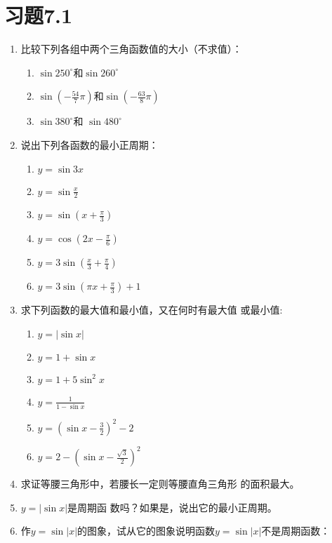 \section*{习题7.1}
\begin{enumerate}
    \item 比较下列各组中两个三角函数值的大小（不求值）：
    \begin{enumerate}
        \item $\sin250^{\circ}$和$\sin260^{\circ}$
        \item $\sin\left(-\frac{54}{7}\pi\right)$和$\sin\left(-\frac{63}{8}\pi\right)$
        \item $\sin380^{\circ}$和 $\sin480^{\circ}$
    \end{enumerate}
    
    \item 说出下列各函数的最小正周期：
\begin{multicols}{2}
    \begin{enumerate}
        \item $y=\sin 3x$
        \item $y=\sin\frac{x}{2}$
        \item $y=\sin \left(x+\frac{\pi}{3}\right)$
        \item $y=\cos \left(2 x-\frac{\pi}{6}\right)$
        \item $y=3 \sin \left(\frac{x}{3}+\frac{\pi}{4}\right)$
        \item $y=3 \sin \left(\pi x+\frac{\pi}{3}\right)+1$
    \end{enumerate}
\end{multicols}

\item 求下列函数的最大值和最小值，又在何时有最大值
或最小值:
\begin{multicols}{2}
    \begin{enumerate}
\item $y=|\sin x|$
\item $y=1+\sin x$
\item $y=1+5 \sin ^{2} x$
\item $y=\frac{1}{1-\sin x}$
\item $y=\left(\sin x-\frac{3}{2}\right)^{2}-2 $
\item $y=2-\left(\sin x-\frac{\sqrt{3}}{2}\right)^{2}$
    \end{enumerate}
\end{multicols}

\item 求证等腰三角形中，若腰长一定则等腰直角三角形
的面积最大。
\item $y=|\sin x|$是周期函
数吗？如果是，说出它的最小正周期。
\item 作$y=\sin|x|$的图象，试从它的图象说明函数$y=\sin|x|$不是周期函数：


\end{enumerate}
